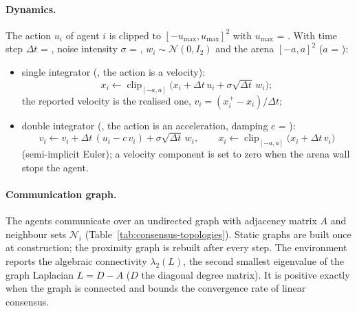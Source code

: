 \paragraph{Dynamics.} The action $u_i$ of agent $i$ is clipped to
$[-u_{\max}, u_{\max}]^2$ with $u_{\max}$ = . With time step
$\Delta t$ = , noise intensity $\sigma$ = ,
$w_i \sim \mathcal{N}(0, I_2)$ and the arena
$[-a, a]^2$ ($a$ = ):
\begin{itemize}
  \item single integrator (, the action is a velocity):
    \begin{equation}
      x_i \leftarrow \operatorname{clip}_{[-a, a]}\bigl(x_i + \Delta t\, u_i
        + \sigma \sqrt{\Delta t}\, w_i\bigr);
    \end{equation}
    the reported velocity is the realised one, $v_i = (x_i^{+} - x_i)/\Delta t$;
  \item double integrator (, the action is an
    acceleration, damping $c$ = ):
    \begin{equation}
      v_i \leftarrow v_i + \Delta t\,(u_i - c\, v_i) + \sigma \sqrt{\Delta t}\, w_i,
      \qquad
      x_i \leftarrow \operatorname{clip}_{[-a, a]}\bigl(x_i + \Delta t\, v_i\bigr)
    \end{equation}
    (semi-implicit Euler); a velocity component is set to zero when the arena
    wall stops the agent.
\end{itemize}

\paragraph{Communication graph.} The agents communicate over an undirected graph
with adjacency matrix $A$ and neighbour sets $\mathcal{N}_i$
(Table~\ref{tab:consensus-topologies}). Static graphs are built once at
construction; the proximity graph is rebuilt after every step. The
environment reports the algebraic connectivity $\lambda_2(L)$, the second
smallest eigenvalue of the graph Laplacian $L = D - A$ ($D$ the diagonal degree
matrix). It is positive exactly when the graph is connected and bounds the
convergence rate of linear consensus.

